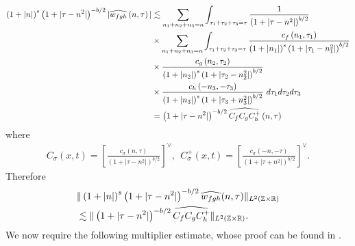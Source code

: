 \begin{equation*}
  \begin{split}
    \left (1 + |n| \right )^s \left( 1 +  | \tau - n^{2}  | \right)^{-b/2} | 
    \widehat{{w}_{fgh}}\left( n, \tau \right) | 
    & \lesssim \sum_{n_1 + n_2 + n_3 = n} \int_{\tau_1 + \tau_2 + \tau_3 = \tau} \frac{1}{\left( 1 +
    | \tau - n^{2}| 
    \right)^{b/2}}  
    \\
    & \times
    \sum_{n_1 + n_2 + n_3 = n} \int_{\tau_1 + \tau_2 + \tau_3 = \tau} \frac{c_f\left( n_1, \tau_1 
    \right)}{\left (1 + |n_1| \right )^s \left( 1 + | \tau_1 - n_1^2 |
    \right)^{b/2}}
    \\
    & \times \frac{c_{g}\left( n_2, \tau_2 \right)}{\left (1 + |n_2| \right ) 
    ^s\left( 1 + | \tau_2 -  n_2^2| 
    \right)^{b/2}}
    \\
    & \times \frac{c_{h}\left( -n_3, -\tau_3 \right)}{\left (1 + |n_3| \right ) ^s\left( 1 + | 
    \tau_3 + n_3^2 | \right)^{b/2}} \ d \tau_1 d \tau_2 d \tau_3
    \\
    & = \left( 1 + | \tau - n^{2} | \right)^{-b/2}
    \widehat{C_f C_{g} C^+_{h}} \left( n, \tau \right)
  \end{split}
\end{equation*}
%
%
where
%
%
\begin{equation*}
  \begin{split}
    C_\sigma(x, t) = \left[ \frac{c_\sigma\left( n, \tau \right)}{\left( 
    1 + | \tau - n^{2} | \right)^{b/2}} \right]^\vee,
    \ \ C^+_\sigma(x, t) = \left[ \frac{c_\sigma\left( -n, -\tau \right)}{\left( 
    1 + | \tau + n^{2} | \right)^{b/2}} \right]^\vee.
  \end{split}
\end{equation*}
%
%
Therefore
%
%
\begin{equation}
  \label{pgen-holder-pre-estimate}
  \begin{split}
    & \| \left( 1 + |n | \right)^s
    \left( 1 + | \tau - n^{2} | \right)^{-b/2} \widehat{{w}_{fgh}}(n, 
    \tau)		
    \|_{L^2(\mathbb{Z} \times \mathbb{R})}
    \\
    & \lesssim \| \left( 1 + | \tau - n^{2} | \right)^{-b/2}
    \widehat{C_f C_{g} C^+_{h}} \|_{L^2(\mathbb{Z} \times \mathbb{R})}.
  \end{split}
\end{equation}
%
We now require the following multiplier estimate, whose proof can be found in 
\cite{Himonas-Misiolek-2001-A-priori-estimates-for-Schrodinger}.
%
%
%
%
%
%

